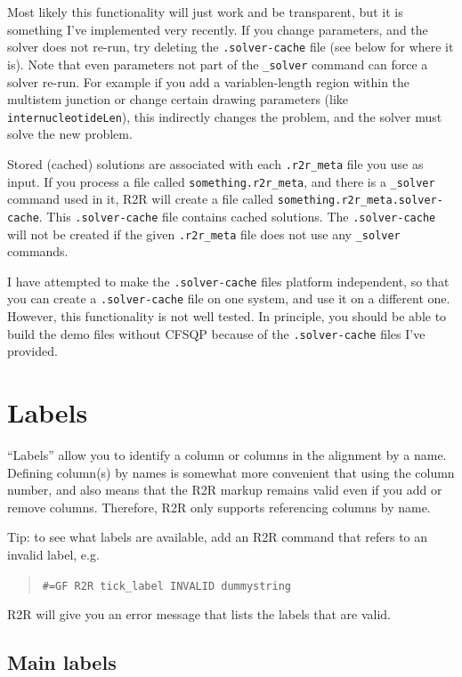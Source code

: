 \documentclass[letterpaper,12pt]{report}
\newcommand{\example}[1]{
\begin{quote}
{\raggedright
#1
}
\end{quote}
}
\begin{document}
Most likely this functionality will just work and be transparent, but it is something I've implemented very recently.
If you change parameters, and the solver does not re-run, try deleting the {\tt .solver-cache} file (see below for where it is).
Note that even parameters not part of the {\tt \_solver} command can force a solver re-run.  For example if you add a variablen-length region within the multistem junction or change certain drawing parameters (like {\tt internucleotideLen}), this indirectly changes the problem, and the solver must solve the new problem.

Stored (cached) solutions are associated with each {\tt .r2r\_meta} file you use as input.  If you process a file called {\tt something.r2r\_meta}, and there is a {\tt \_solver} command used in it, R2R will create a file called {\tt something.r2r\_meta.solver-cache}. This {\tt .solver-cache} file contains cached solutions.  The {\tt .solver-cache} will not be created if the given {\tt .r2r\_meta} file does not use any {\tt \_solver} commands.

I have attempted to make the {\tt .solver-cache} files platform independent, so that you can create a {\tt .solver-cache} file on one system, and use it on a different one.  However, this functionality is not well tested.  In principle, you should be able to build the demo files without CFSQP because of the {\tt .solver-cache} files I've provided.

\section{Labels}
\label{sec:labels}

``Labels'' allow you to identify a column or columns in the alignment by a name.
Defining column(s) by names is somewhat more convenient that using the column number,
and also means that the R2R markup remains valid even if you add or remove columns.
Therefore, R2R only supports referencing columns by name.

Tip: to see what labels are available, add an R2R command that refers to an invalid label, e.g.

\example{{\tt \#=GF R2R tick\_label INVALID dummystring}}

R2R will give you an error message that lists the labels that are valid.

\subsection{Main labels}
\end{document}
